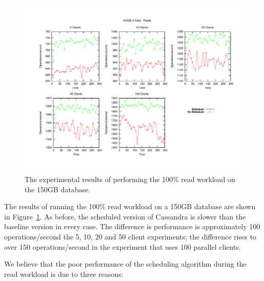 \begin{figure}[t]
\centering
\includegraphics[scale=0.563]{images/150GB_Reads.pdf}
\vspace{-15pt}
\caption{The experimental results of performing the 100\% read workload on the 150GB database.}
\label{fig:150g_reads}
\end{figure}

The results of running the 100\% read workload on a 150GB database are shown in Figure~\ref{fig:150g_reads}. As before, the scheduled version of Cassandra is slower than the baseline version in every case. The difference is performance is approximately 100 operations/second the 5, 10, 20 and 50 client experiments; the difference rises to over 150 operations/second in the experiment that uses 100 parallel clients.

We believe that the poor performance of the scheduling algorithm during the read workload is due to three reasons:

